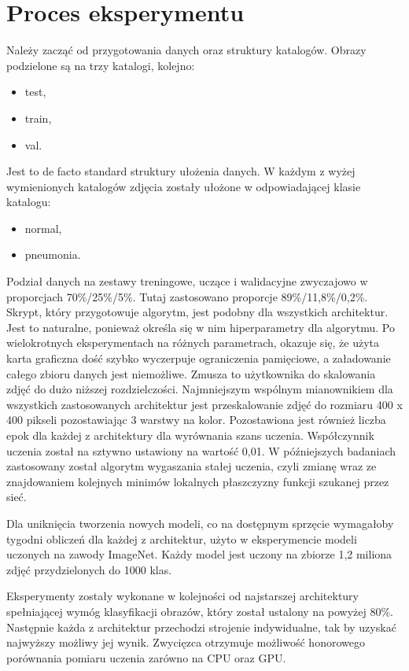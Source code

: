 \documentclass[12pt,a4paper,twoside,titlepage,openright]{book}
\begin{document}
\section{Proces eksperymentu}
Należy zacząć od przygotowania danych oraz struktury katalogów. Obrazy podzielone są na trzy katalogi, kolejno:
\begin{itemize}
\item test,
\item train,
\item val.
\end{itemize}

Jest to de facto standard struktury ułożenia danych. W każdym z wyżej wymienionych katalogów zdjęcia zostały ułożone w odpowiadającej klasie katalogu:
\begin{itemize}
\item normal,
\item pneumonia.
\end{itemize}

Podział danych na zestawy treningowe, uczące i walidacyjne zwyczajowo w proporcjach 70\%/25\%/5\%. Tutaj zastosowano proporcje 89\%/11,8\%/0,2\%.
Skrypt, który przygotowuje algorytm, jest podobny dla wszystkich architektur. Jest to naturalne, ponieważ określa się w nim hiperparametry dla algorytmu. Po wielokrotnych eksperymentach na różnych parametrach, okazuje się, że użyta karta graficzna dość szybko wyczerpuje ograniczenia pamięciowe, a załadowanie całego zbioru danych jest niemożliwe. Zmusza to użytkownika do skalowania zdjęć do dużo niższej rozdzielczości. Najmniejszym wspólnym mianownikiem dla wszystkich zastosowanych architektur jest przeskalowanie zdjęć do rozmiaru 400 x 400 pikseli pozostawiając 3 warstwy na kolor. Pozostawiona jest również liczba epok dla każdej z architektury dla wyrównania szans uczenia. Współczynnik uczenia został na sztywno ustawiony na wartość 0,01. W późniejszych badaniach zastosowany został algorytm wygaszania stałej uczenia, czyli zmianę wraz ze znajdowaniem kolejnych minimów lokalnych płaszczyzny funkcji szukanej przez sieć.

Dla uniknięcia tworzenia nowych modeli, co na dostępnym sprzęcie wymagałoby tygodni obliczeń dla każdej z architektur, użyto w eksperymencie modeli uczonych na zawody ImageNet. Każdy model jest uczony na zbiorze 1,2 miliona zdjęć przydzielonych do 1000 klas.

Eksperymenty zostały wykonane w kolejności od najstarszej architektury spełniającej wymóg klasyfikacji obrazów, który został ustalony na powyżej 80\%. Następnie każda z architektur przechodzi strojenie indywidualne, tak by uzyskać najwyższy możliwy jej wynik. Zwycięzca otrzymuje możliwość honorowego porównania pomiaru uczenia zarówno na CPU oraz GPU.
\end{document}
